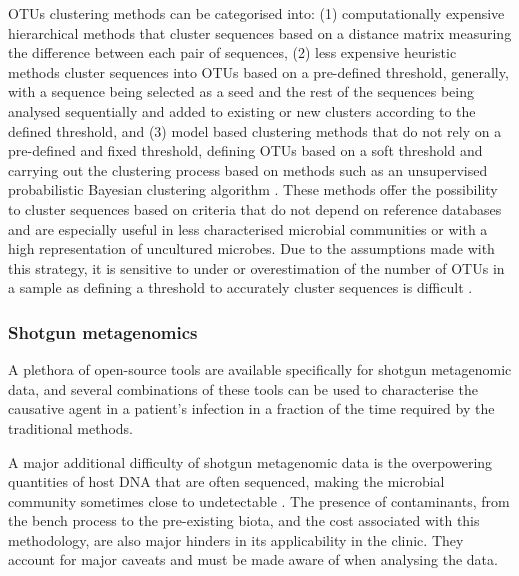 \ac{OTUs} clustering methods can be categorised into: (1) computationally expensive hierarchical methods that cluster sequences based on a distance matrix measuring the difference between each pair of sequences, (2) less expensive heuristic methods cluster sequences into \ac{OTUs} based on a pre-defined threshold, generally, with a sequence being selected as a seed and the rest of the sequences being analysed sequentially and added to existing or new clusters according to the defined threshold, and (3) model based clustering methods that do not rely on a pre-defined and fixed threshold, defining \ac{OTUs} based on a soft threshold and carrying out the clustering process based on methods such as an unsupervised probabilistic Bayesian clustering algorithm \citep{hao_clustering_2011}. These methods offer the possibility to cluster sequences based on criteria that do not depend on reference databases and are especially useful in less characterised microbial communities or with a high representation of uncultured microbes. Due to the assumptions made with this strategy, it is sensitive to under or overestimation of the number of \ac{OTUs} in a sample as defining a threshold to accurately cluster sequences is difficult \citep{westcott_novo_2015}.

\subsubsection{Shotgun metagenomics} \label{ssec:_intro_shotgun_metagenomics_bioinfo}

A plethora of open-source tools are available specifically for shotgun metagenomic data, and several combinations of these tools can be used to characterise the causative agent in a patient's infection in a fraction of the time required by the traditional methods. 

A major additional difficulty of shotgun metagenomic data is the overpowering quantities of host \ac{DNA} that are often sequenced, making the microbial community sometimes close to undetectable \citep{couto_critical_2018}.
The presence of contaminants, from the bench process to the pre-existing biota, and the cost associated with this methodology, are also major hinders in its applicability in the clinic.
They account for major caveats and must be made aware of when analysing the data.

